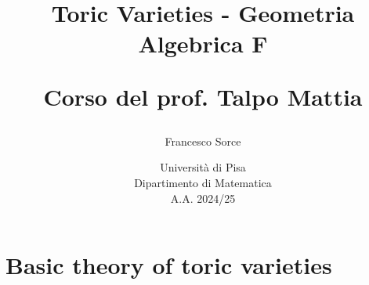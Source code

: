 \documentclass[a4paper]{report}
\title{\huge Toric Varieties - Geometria Algebrica F
\vspace{0.7cm}

\Large Corso del prof. Talpo Mattia}
\author{\Large Francesco Sorce}
\date{Università di Pisa\\
Dipartimento di Matematica\\
A.A. 2024/25}
\begin{document}
\maketitle

\tableofcontents
\newpage



\part{Basic theory of toric varieties}





\appendix


\end{document}
